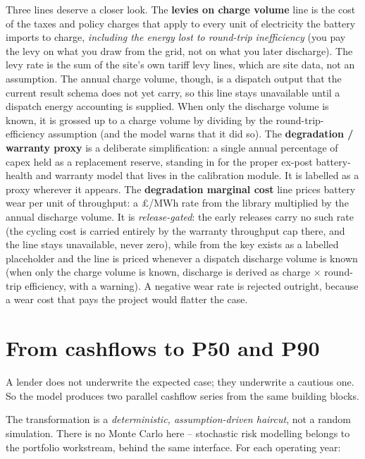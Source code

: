 Three lines deserve a closer look. The \textbf{levies on charge volume} line is the cost of the taxes and policy charges that apply to every unit of electricity the battery imports to charge, \emph{including the energy lost to round-trip inefficiency} (you pay the levy on what you draw from the grid, not on what you later discharge). The levy rate is the sum of the site's own tariff levy lines, which are site data, not an assumption. The annual charge volume, though, is a dispatch output that the current result schema does not yet carry, so this line stays unavailable until a dispatch energy accounting is supplied. When only the discharge volume is known, it is grossed up to a charge volume by dividing by the round-trip-efficiency assumption (and the model warns that it did so). The \textbf{degradation / warranty proxy} is a deliberate simplification: a single annual percentage of capex held as a replacement reserve, standing in for the proper ex-post battery-health and warranty model that lives in the calibration module. It is labelled as a proxy wherever it appears. The \textbf{degradation marginal cost} line prices battery wear per unit of throughput: a \pounds/MWh rate from the library multiplied by the annual discharge volume. It is \emph{release-gated}: the early releases carry no such rate (the cycling cost is carried entirely by the warranty throughput cap there, and the line stays unavailable, never zero), while from  the key exists as a labelled placeholder and the line is priced whenever a dispatch discharge volume is known (when only the charge volume is known, discharge is derived as charge $\times$ round-trip efficiency, with a warning). A negative wear rate is rejected outright, because a wear cost that pays the project would flatter the case.

\section{From cashflows to P50 and P90}

A lender does not underwrite the expected case; they underwrite a cautious one. So the model produces two parallel cashflow series from the same building blocks.

The transformation is a \emph{deterministic, assumption-driven haircut}, not a random simulation. There is no Monte Carlo here -- stochastic risk modelling belongs to the portfolio workstream, behind the same interface. For each operating year:

